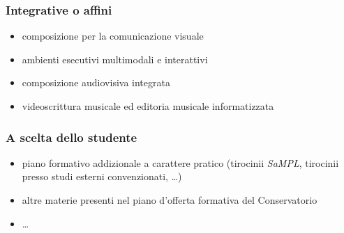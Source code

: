 \begin{frame}
  \frametitle<+->{Integrative o affini}

	\begin{itemize}

    \item composizione per la comunicazione visuale

    \item ambienti esecutivi multimodali e interattivi

    \item composizione audiovisiva integrata

    \item videoscrittura musicale ed editoria musicale informatizzata

	\end{itemize}

\end{frame}

\begin{frame}
  \frametitle<+->{A scelta dello studente}

	\begin{itemize}

    \item piano formativo addizionale a carattere pratico (tirocinii \emph{SaMPL},
    tirocinii presso studi esterni convenzionati, \ldots)

    \item altre materie presenti nel piano d'offerta formativa del Conservatorio

    \item \ldots

	\end{itemize}

\end{frame}
